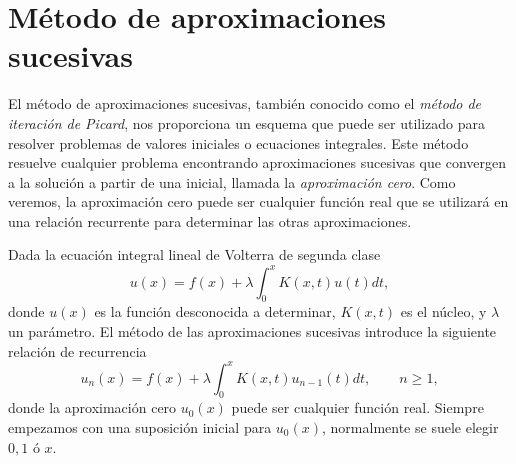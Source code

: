 \section{Método de aproximaciones sucesivas}
El método de aproximaciones sucesivas, también conocido como el \textit{método de iteración de Picard}, nos proporciona un esquema que puede ser utilizado para resolver problemas de valores iniciales o ecuaciones integrales. Este método resuelve cualquier problema encontrando aproximaciones sucesivas que convergen a la solución a partir de una inicial, llamada la \textit{aproximación cero}. Como veremos, la aproximación cero puede ser cualquier función real que se utilizará en una relación recurrente para determinar las otras aproximaciones.

Dada la ecuación integral lineal de Volterra de segunda clase
\begin{equation}
	u(x) = f(x) + \lambda \int_{0}^{x} K(x,t)u(t)dt,
\end{equation}
donde $u(x)$ es la función desconocida a determinar, $K(x,t)$ es el núcleo, y $\lambda$ un parámetro. El método de las aproximaciones sucesivas introduce la siguiente relación de recurrencia
\begin{equation}\label{eq:aprox1}
	u_n(x) = f(x) + \lambda \int_{0}^{x} K(x,t)u_{n-1}(t)dt, \qquad n \geqslant 1,
\end{equation}
donde la aproximación cero $u_0(x)$ puede ser cualquier función real. Siempre empezamos con una suposición inicial para $u_0(x)$, normalmente se suele elegir $0, 1$ ó $x$.

